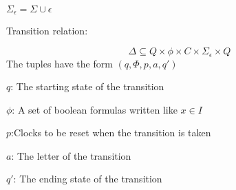 $\Sigma_\epsilon=\Sigma\cup{\epsilon}$
\begin{definition}
    Transition relation:

    $$\Delta\subseteq Q\times\phi\times C\times\Sigma_\epsilon\times Q$$
The tuples have the form $(q,\Phi,p,a,q')$

$q$: The starting state of the transition

$\phi$: A set of boolean formulas written like $x\in I$

$p$:Clocks to be reset when the transition is taken

$a$: The letter of the transition

$q'$: The ending state of the transition
\end{definition}\cite*{Eugene2001}